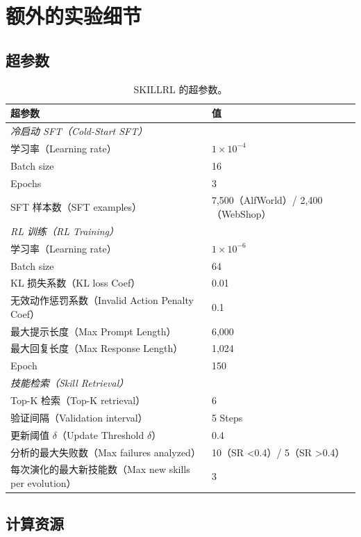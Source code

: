 \documentclass[11pt,UTF8,fontset=fandol]{ctexart}
\begin{document}
\section{额外的实验细节}

\subsection{超参数}

\begin{table}[H]\centering
\caption{SKILLRL 的超参数。}
\label{tab:4}
\begin{tabular}{ll}
\toprule
超参数 & 值 \\
\midrule
\multicolumn{2}{l}{\textit{冷启动 SFT（Cold-Start SFT）}} \\
\quad 学习率（Learning rate） & $1 \times 10^{-4}$ \\
\quad Batch size & 16 \\
\quad Epochs & 3 \\
\quad SFT 样本数（SFT examples） & 7,500（AlfWorld）/ 2,400（WebShop） \\
\multicolumn{2}{l}{\textit{RL 训练（RL Training）}} \\
\quad 学习率（Learning rate） & $1 \times 10^{-6}$ \\
\quad Batch size & 64 \\
\quad KL 损失系数（KL loss Coef） & 0.01 \\
\quad 无效动作惩罚系数（Invalid Action Penalty Coef） & 0.1 \\
\quad 最大提示长度（Max Prompt Length） & 6,000 \\
\quad 最大回复长度（Max Response Length） & 1,024 \\
\quad Epoch & 150 \\
\multicolumn{2}{l}{\textit{技能检索（Skill Retrieval）}} \\
\quad Top-K 检索（Top-K retrieval） & 6 \\
\quad 验证间隔（Validation interval） & 5 Steps \\
\quad 更新阈值 $\delta$（Update Threshold $\delta$） & 0.4 \\
\quad 分析的最大失败数（Max failures analyzed） & 10（SR \textless 0.4）/ 5（SR \textgreater 0.4） \\
\quad 每次演化的最大新技能数（Max new skills per evolution） & 3 \\
\bottomrule
\end{tabular}
\end{table}

\subsection{计算资源}
\end{document}
